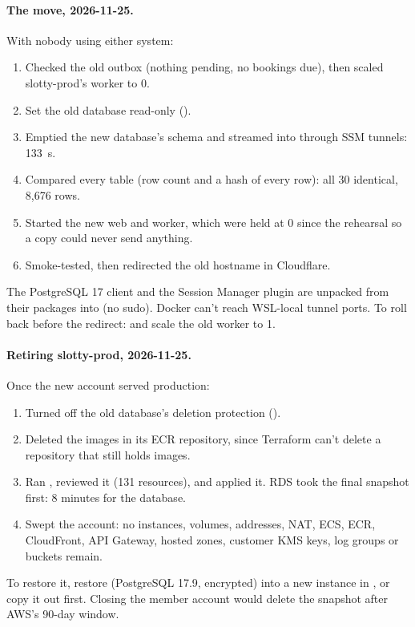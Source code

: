 \paragraph{The move, 2026-11-25.} With nobody using either system:
\begin{enumerate}
  \item Checked the old outbox (nothing pending, no bookings due), then scaled slotty-prod's
    worker to 0.
  \item Set the old database read-only
    ().
  \item Emptied the new database's  schema and streamed
     into
     through SSM tunnels: 133~s.
  \item Compared every table (row count and a hash of every row): all 30 identical, 8,676 rows.
  \item Started the new web and worker, which were held at 0 since the rehearsal so a copy could
    never send anything.
  \item Smoke-tested, then redirected the old hostname in Cloudflare.
\end{enumerate}
The PostgreSQL 17 client and the Session Manager plugin are unpacked from their packages into
 (no sudo). Docker can't reach WSL-local tunnel ports. To roll
back before the redirect: 
and scale the old worker to 1.

\paragraph{Retiring slotty-prod, 2026-11-25.} Once the new account served production:
\begin{enumerate}
  \item Turned off the old database's deletion protection
    ().
  \item Deleted the images in its ECR repository, since Terraform can't delete a repository
    that still holds images.
  \item Ran , reviewed it (131 resources), and applied
    it. RDS took the final snapshot  first: 8 minutes for the database.
  \item Swept the account: no instances, volumes, addresses, NAT, ECS, ECR, CloudFront, API
    Gateway, hosted zones, customer KMS keys, log groups or buckets remain.
\end{enumerate}
To restore it, restore  (PostgreSQL 17.9, encrypted) into a new instance in
, or copy it out first. Closing the member account would delete the snapshot
after AWS's 90-day window.

